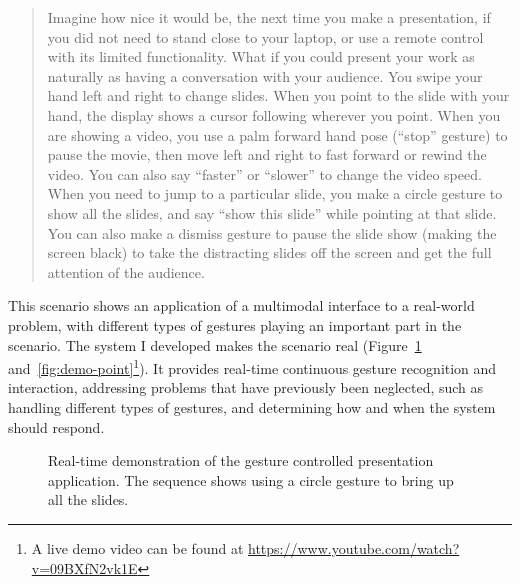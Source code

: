 \begin{quotation}
Imagine how nice it would be, the next time you make a presentation, if you did
not need to stand close to your laptop, or use a remote control with its limited
functionality. What if you could present your work as naturally as having a
conversation with your audience. You swipe your hand left and right to change
slides. When you point to the slide with your hand, the display shows a 
cursor following wherever you point. When you are showing a video, you use a
palm forward hand pose (``stop'' gesture) to pause the movie, then move left and
right to fast forward or rewind the video. You can also say ``faster'' or
``slower'' to change the video speed. When you need to jump to a particular
slide, you make a circle gesture to show all the slides, and say ``show this
slide'' while pointing at that slide. You can also make a dismiss gesture to
pause the slide show (making the screen black) to take the distracting slides
off the screen and get the full attention of the audience.
\end{quotation}

This scenario shows an application of a multimodal interface to a
real-world problem, with different types of gestures playing an important part
in the scenario. The system I developed makes the scenario real
(Figure~\ref{fig:demo-circle}
and~\ref{fig:demo-point}\footnote{A live demo video can be found at
\url{https://www.youtube.com/watch?v=09BXfN2vk1E}}).
It provides real-time continuous gesture recognition and interaction, addressing problems that have previously been neglected, such as handling different types of gestures, and determining how and when the system should respond.


\begin{figure}[tbh]
\centering
\hspace{-0.6em}
\caption{Real-time demonstration of the gesture controlled presentation
application. The sequence shows using a circle gesture to bring up all the
slides.}
\label{fig:demo-circle}
\end{figure}


